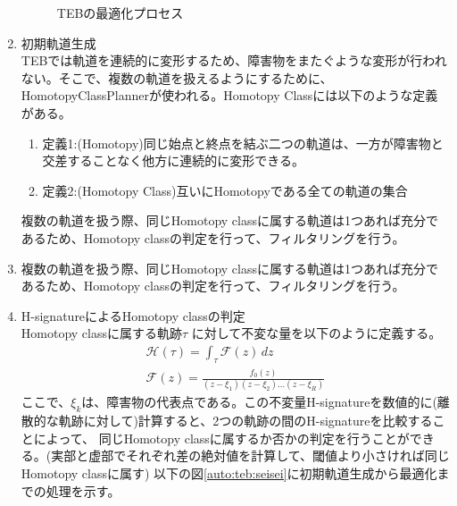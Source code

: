 \begin{enumerate}
\begin{figure}[h]
\begin{center}
    \caption{TEBの最適化プロセス}
    \label{auto:teb:opt}
  \end{center}
\end{figure}
\item 初期軌道生成\\
TEBでは軌道を連続的に変形するため、障害物をまたぐような変形が行われない。そこで、複数の軌道を扱えるようにするために、HomotopyClassPlanner\cite{auto:teb3}が使われる。Homotopy Classには以下のような定義がある。
\begin{enumerate}
  \item 定義1:(Homotopy)同じ始点と終点を結ぶ二つの軌道は、一方が障害物と交差することなく他方に連続的に変形できる。
  \item 定義2:(Homotopy Class)互いにHomotopyである全ての軌道の集合
\end{enumerate}
複数の軌道を扱う際、同じHomotopy classに属する軌道は1つあれば充分であるため、Homotopy classの判定を行って、フィルタリングを行う。
\item 複数の軌道を扱う際、同じHomotopy classに属する軌道は1つあれば充分であるため、Homotopy classの判定を行って、フィルタリングを行う。
\item H-signatureによるHomotopy classの判定\\
Homotopy classに属する軌跡$\tau$ に対して不変な量を以下のように定義する。
\begin{align*}
  \mathcal{H}(\tau)=\int_{\tau}\mathcal{F}(z) \,dz\\
  \mathcal{F}(z)=\frac{f_0(z)}{(z-\xi_1) (z-\xi_2) \ldots (z-\xi_R)}
\end{align*}
ここで、$\xi_k$は、障害物の代表点である。この不変量H-signatureを数値的に(離散的な軌跡に対して)計算すると、2つの軌跡の間のH-signatureを比較することによって、
同じHomotopy classに属するか否かの判定を行うことができる。(実部と虚部でそれぞれ差の絶対値を計算して、閾値より小さければ同じHomotopy classに属す)
以下の図\ref{auto:teb:seisei}に初期軌道生成から最適化までの処理を示す。


\end{enumerate}
